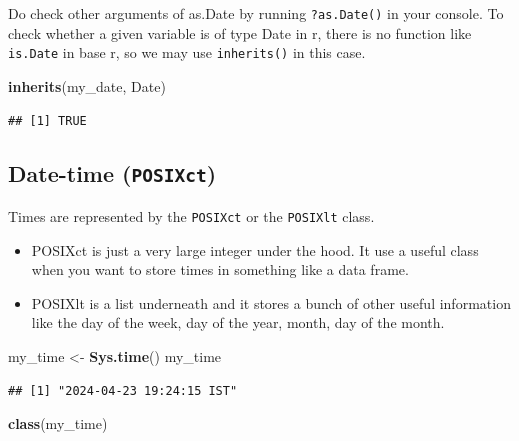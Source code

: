 \documentclass[
]{book}
\newenvironment{Shaded}{\begin{snugshade}}{\end{snugshade}}
\newcommand{\FunctionTok}[1]{\textcolor[rgb]{0.13,0.29,0.53}{\textbf{#1}}}
\newcommand{\NormalTok}[1]{#1}
\newcommand{\OtherTok}[1]{\textcolor[rgb]{0.56,0.35,0.01}{#1}}
\newcommand{\StringTok}[1]{\textcolor[rgb]{0.31,0.60,0.02}{#1}}
\providecommand{\tightlist}{%
  \setlength{\itemsep}{0pt}\setlength{\parskip}{0pt}}
\begin{document}
Do check other arguments of as.Date by running \texttt{?as.Date()} in your console. To check whether a given variable is of type Date in r, there is no function like \texttt{is.Date} in base r, so we may use \texttt{inherits()} in this case.

\begin{Shaded}
\begin{Highlighting}[]
\FunctionTok{inherits}\NormalTok{(my\_date, }\StringTok{\textquotesingle{}Date\textquotesingle{}}\NormalTok{)}
\end{Highlighting}
\end{Shaded}

\begin{verbatim}
## [1] TRUE
\end{verbatim}

\hypertarget{date-time-posixct}{%
\subsection{\texorpdfstring{Date-time (\texttt{POSIXct})}{Date-time (POSIXct)}}\label{date-time-posixct}}

Times are represented by the \texttt{POSIXct} or the \texttt{POSIXlt} class.

\begin{itemize}
\tightlist
\item
  POSIXct is just a very large integer under the hood. It use a useful class when you want to store times in something like a data frame.
\item
  POSIXlt is a list underneath and it stores a bunch of other useful information like the day of the week, day of the year, month, day of the month.
\end{itemize}

\begin{Shaded}
\begin{Highlighting}[]
\NormalTok{my\_time }\OtherTok{\textless{}{-}} \FunctionTok{Sys.time}\NormalTok{()}
\NormalTok{my\_time}
\end{Highlighting}
\end{Shaded}

\begin{verbatim}
## [1] "2024-04-23 19:24:15 IST"
\end{verbatim}

\begin{Shaded}
\begin{Highlighting}[]
\FunctionTok{class}\NormalTok{(my\_time)}
\end{Highlighting}
\end{Shaded}
\end{document}
